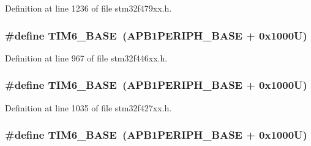 Definition at line 1236 of file stm32f479xx.\+h.

\subsubsection[{\texorpdfstring{T\+I\+M6\+\_\+\+B\+A\+SE}{TIM6_BASE}}]{\setlength{\rightskip}{0pt plus 5cm}\#define T\+I\+M6\+\_\+\+B\+A\+SE~({\bf A\+P\+B1\+P\+E\+R\+I\+P\+H\+\_\+\+B\+A\+SE} + 0x1000\+U)}\hypertarget{group___peripheral__memory__map_ga8268ec947929f192559f28c6bf7d1eac}{}\label{group___peripheral__memory__map_ga8268ec947929f192559f28c6bf7d1eac}


Definition at line 967 of file stm32f446xx.\+h.

\subsubsection[{\texorpdfstring{T\+I\+M6\+\_\+\+B\+A\+SE}{TIM6_BASE}}]{\setlength{\rightskip}{0pt plus 5cm}\#define T\+I\+M6\+\_\+\+B\+A\+SE~({\bf A\+P\+B1\+P\+E\+R\+I\+P\+H\+\_\+\+B\+A\+SE} + 0x1000\+U)}\hypertarget{group___peripheral__memory__map_ga8268ec947929f192559f28c6bf7d1eac}{}\label{group___peripheral__memory__map_ga8268ec947929f192559f28c6bf7d1eac}


Definition at line 1035 of file stm32f427xx.\+h.

\subsubsection[{\texorpdfstring{T\+I\+M6\+\_\+\+B\+A\+SE}{TIM6_BASE}}]{\setlength{\rightskip}{0pt plus 5cm}\#define T\+I\+M6\+\_\+\+B\+A\+SE~({\bf A\+P\+B1\+P\+E\+R\+I\+P\+H\+\_\+\+B\+A\+SE} + 0x1000\+U)}\hypertarget{group___peripheral__memory__map_ga8268ec947929f192559f28c6bf7d1eac}{}\label{group___peripheral__memory__map_ga8268ec947929f192559f28c6bf7d1eac}


